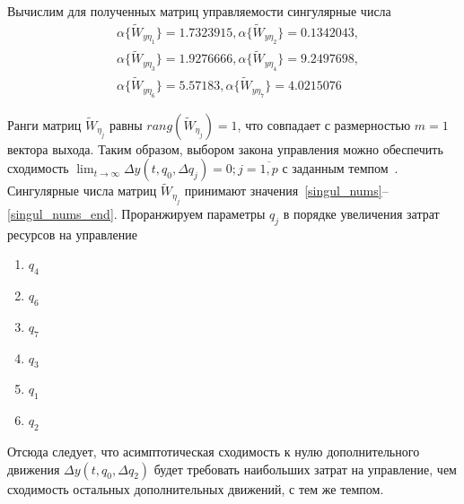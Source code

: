 Вычислим для полученных матриц управляемости сингулярные числа
\begin{align}\label{singul_nums}
	&\alpha\{\tilde{W}_{y \eta_{1}}\} = 1.7323915,
	\alpha\{\tilde{W}_{y \eta_{2}}\} = 0.1342043,\\	
	&\alpha\{\tilde{W}_{y \eta_{3}}\} = 1.9276666,	
	\alpha\{\tilde{W}_{y \eta_{4}}\} = 9.2497698,\\		
	&\alpha\{\tilde{W}_{y \eta_{6}}\} = 5.57183,
	\alpha\{\tilde{W}_{y \eta_{7}}\} =  4.0215076
	\label{singul_nums_end}
\end{align}
           

Ранги матриц $\tilde{W}_{\eta_j}$ равны $rang(\tilde{W}_{\eta_j}) = 1$, что совпадает с размерностью $m = 1$ вектора выхода. Таким образом, выбором закона
управления можно обеспечить сходимость $\lim_{t  \to \infty} \Delta y (t,q_0,\Delta q_j) = 0; j = \overline{1, p}$ с заданным темпом~\cite{NSUsh}. 
Сингулярные числа матриц $\tilde{W}_{\eta_j}$ принимают значения~\ref{singul_nums}--\ref{singul_nums_end}. Проранжируем параметры $q_j$ в порядке увеличения затрат ресурсов на управление
\begin{enumerate}
	\item $q_4$
	\item $q_6$
	\item $q_7$
	\item $q_3$
	\item $q_1$
	\item $q_2$			
\end{enumerate}

Отсюда следует, что асимптотическая сходимость к нулю дополнительного движения $\Delta y (t,q_0,\Delta q_2)$ будет требовать наибольших затрат на управление, чем сходимость остальных дополнительных движений, с тем же темпом.

\newpage